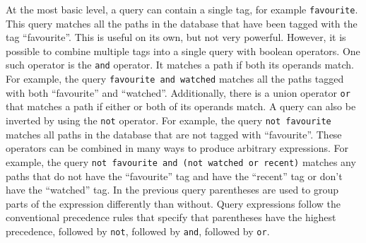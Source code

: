 At the most basic level, a query can contain a single tag, for example
\texttt{favourite}. This query matches all the paths in the database that have
been tagged with the tag ``favourite''. This is useful on its own, but not very
powerful. However, it is possible to combine multiple tags into a single query
with boolean operators. One such operator is the \texttt{and} operator. It
matches a path if both its operands match. For example, the query
\texttt{favourite and watched} matches all the paths tagged with both
``favourite'' and ``watched''. Additionally, there is a union operator
\texttt{or} that matches a path if either or both of its operands match. A
query can also be inverted by using the \texttt{not} operator. For example, the
query \texttt{not favourite} matches all paths in the database that are not
tagged with ``favourite''. These operators can be combined in many ways to
produce arbitrary expressions. For example, the query \texttt{not favourite and
(not watched or recent)} matches any paths that do not have the ``favourite''
tag and have the ``recent'' tag or don't have the ``watched'' tag. In the
previous query parentheses are used to group parts of the expression
differently than without. Query expressions follow the conventional precedence
rules that specify that parentheses have the highest precedence, followed by
\texttt{not}, followed by \texttt{and}, followed by \texttt{or}.

